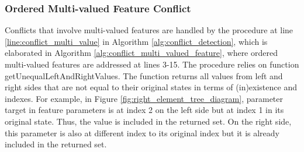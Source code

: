\subsubsection{Ordered Multi-valued Feature Conflict} 
\label{sec:ordered_conflict}
Conflicts that involve multi-valued features are handled by the procedure at line \ref{line:conflict_multi_value} in Algorithm \ref{alg:conflict_detection}, which is elaborated in Algorithm \ref{alg:conflict_multi_valued_feature}, where ordered multi-valued features are addressed at lines 3-15. The procedure relies on function \textsf{getUnequalLeftAndRightValues}. The function returns all values from left and right sides that are not equal to their original states in terms of (in)existence and indexes. For example, in Figure \ref{fig:right_element_tree_diagram}, parameter \textsf{target} in feature \textsf{parameters} is at index 2 on the left side but at index 1 in its original state. Thus, the value is included in the returned set. On the right side, this parameter is also at different index to its original index but it is already included in the returned set. 

